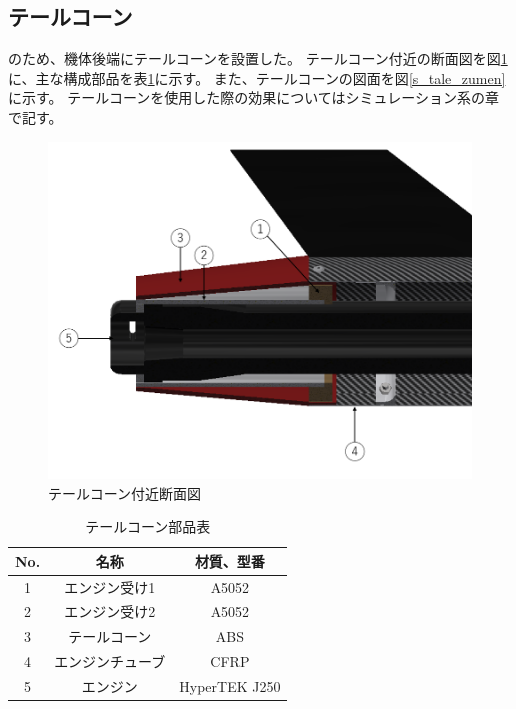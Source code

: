 \documentclass[a4paper,11pt,titlepage,uplatex]{jsarticle}
\begin{document}
\newpage
\subsection{テールコーン}
\label{tale}

のため、機体後端にテールコーンを設置した。
テールコーン付近の断面図を図\ref{s_tale_num}に、主な構成部品を表\ref{s_tale_table}に示す。
また、テールコーンの図面を図\ref{s_tale_zumen}に示す。
テールコーンを使用した際の効果についてはシミュレーション系の章で記す。

\begin{figure}[H]
    \centering
    \includegraphics[scale = 0.4]{pic_str/s_talecorn_num.png}
    \caption{テールコーン付近断面図}
    \label{s_tale_num}
\end{figure}

\begin{table}[H]
    \centering
    \caption{テールコーン部品表}
    \begin{tabular}{ccc} \toprule
        No. & 名称       & 材質、型番         \\ \midrule
        1   & エンジン受け1  & A5052         \\
        2   & エンジン受け2  & A5052         \\
        3   & テールコーン   & ABS           \\
        4   & エンジンチューブ & CFRP          \\
        5   & エンジン     & HyperTEK J250 \\ \bottomrule
    \end{tabular}
    \label{s_tale_table}
\end{table}
\end{document}
